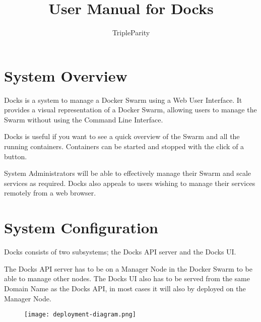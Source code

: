 \documentclass[]{article}
\title{User Manual for Docks}
\author{TripleParity}
\date{}
\begin{document}
	
\maketitle

\tableofcontents

\section{System Overview}
Docks is a system to manage a Docker Swarm using a Web User Interface. It provides a visual representation of a Docker Swarm, allowing users to manage the Swarm without using the Command Line Interface.

Docks is useful if you want to see a quick overview of the Swarm and all the running containers. Containers can be started and stopped with the click of a button.

System Administrators will be able to effectively manage their Swarm and scale services as required. Docks also appeals to users wishing to manage their services remotely from a web browser.

\section{System Configuration}
Docks consists of two subsystems; the Docks API server and the Docks UI.

The Docks API server has to be on a Manager Node in the Docker Swarm to be able to manage other nodes. The Docks UI also has to be served from the same Domain Name as the Docks API, in most cases it will also by deployed on the Manager Node.

\begin{figure}[h!]
	\centering
	\texttt{[image: deployment-diagram.png]}
\end{figure}

\pagebreak
\end{document}
